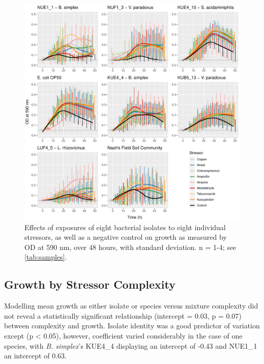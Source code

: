\documentclass[final,1p,times]{elsarticle}
\begin{document}
\begin{figure}[H]
    \centering
    \includegraphics[width = \textwidth]{Scripts/Results/Final_Pipeline/single_stressor_plots.pdf}
    \caption{Effects of exposures of eight bacterial isolates to eight individual stressors, as well as a negative control on growth as measured by OD at 590 nm, over 48 hours, with standard deviation. n = 1-4; see \cref{tab:samples}.}
    \label{fig:sstress}
\end{figure}

\newpage
\subsection{Growth by Stressor Complexity}
\label{S:3:4}

Modelling mean growth as either isolate or species versus mixture complexity did not reveal a statistically significant relationship (intercept = 0.03, p = 0.07) between complexity and growth. Isolate identity was a good predictor of variation except (p < 0.05), however, coefficient varied considerably in the case of one species, with \textit{B. simplex}'s KUE4\_4 displaying an intercept of -0.43 and NUE1\_1 an intercept of 0.63. 
\end{document}
